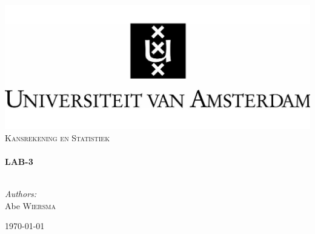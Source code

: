 \begin{titlepage}

\begin{center}
\includegraphics[trim=23mm 0mm 0mm 0mm, width=1\textwidth]{./logo.jpg}\\[1cm]
	\textsc{\Large Kansrekening en Statistiek}\\[0.5cm]

    \HRule \\[0.4cm] { \huge \bfseries LAB-3}\\[0.4cm]

    \HRule \\[1.5cm]

\begin{minipage}{0.4\textwidth}
\begin{flushleft} \large \emph{Authors:}\\
Abe \textsc{Wiersma}\\
\end{flushleft}
\end{minipage}
\begin{minipage}{0.4\textwidth} \begin{flushright} \large \end{flushright}\end{minipage}

    \vfill

    {\large \today}

\end{center}
\end{titlepage}
\pagebreak